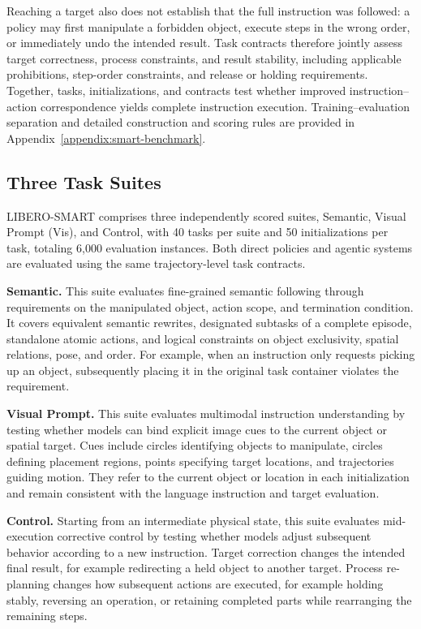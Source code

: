 Reaching a target also does not establish that the full instruction was followed: a policy may first
manipulate a forbidden object, execute steps in the wrong order, or immediately undo the intended
result. Task contracts therefore jointly assess target correctness, process constraints, and result
stability, including applicable prohibitions, step-order constraints, and release or holding
requirements. Together, tasks, initializations, and contracts test whether improved
instruction--action correspondence yields complete instruction execution. Training--evaluation
separation and detailed construction and scoring rules are provided in
Appendix~\ref{appendix:smart-benchmark}.

\hypertarget{three-task-suites}{%
\subsection{Three Task Suites}\label{three-task-suites}}

LIBERO-SMART comprises three independently scored suites, Semantic,
Visual Prompt (Vis), and Control, with 40 tasks per suite and 50
initializations per task, totaling 6,000 evaluation
instances. Both direct policies and agentic systems are evaluated using
the same trajectory-level task contracts.

\textbf{Semantic.} This suite evaluates fine-grained semantic following
through requirements on the manipulated object, action scope, and
termination condition. It covers equivalent
semantic rewrites, designated subtasks of a complete episode, standalone
atomic actions, and logical constraints on object exclusivity, spatial
relations, pose, and order. For example, when an instruction only
requests picking up an object, subsequently placing it in the original
task container violates the requirement.

\textbf{Visual Prompt.} This suite evaluates multimodal instruction
understanding by testing whether models can bind explicit image cues to
the current object or spatial target. Cues include circles
identifying objects to manipulate, circles defining placement regions,
points specifying target locations, and trajectories guiding motion.
They refer to the current object or location in each initialization and
remain consistent with the language instruction and target evaluation.

\textbf{Control.} Starting from an intermediate physical state, this
suite evaluates mid-execution corrective control by testing whether
models adjust subsequent behavior according to a new instruction. Target correction changes the
intended final result, for
example redirecting a held object to another target. Process re-planning
changes how subsequent actions are executed, for example holding
stably, reversing an operation, or retaining completed parts while
rearranging the remaining steps.

